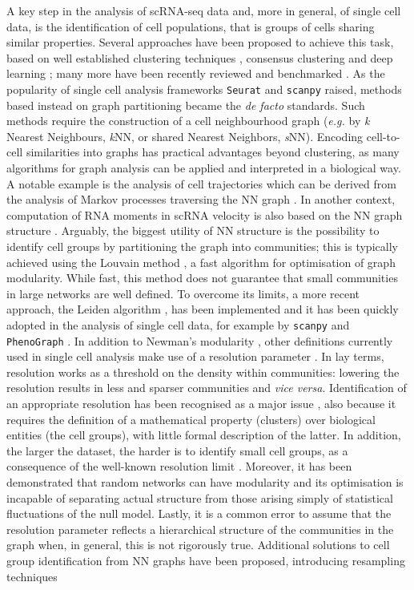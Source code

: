 \documentclass[10pt]{article}
\begin{document}
A key step in the analysis of scRNA-seq data and, more in general, of single cell data, is the identification of cell populations, that is groups of cells sharing similar properties. Several approaches have been proposed to achieve this task, based on well established clustering techniques \cite{wang_2017, lin_2017}, consensus clustering \cite{huh_2020, kiselev_2017, Ranjan_2021} and deep learning \cite{li_2020}; many more have been recently reviewed \cite{krzak_2019, kiselev_2019} and benchmarked \cite{du_2018}. As the popularity of single cell analysis frameworks \texttt{Seurat} \cite{butler_2018} and \texttt{scanpy} \cite{wolf_2018} raised, methods based instead on graph partitioning became the \emph{de facto} standards. Such methods require the construction of a cell neighbourhood graph (\emph{e.g.} by \emph{k }Nearest Neighbours, \emph{k}NN, or shared Nearest Neighbors, \emph{s}NN). Encoding cell-to-cell similarities into graphs has practical advantages beyond clustering, as many algorithms for graph analysis can be applied and interpreted in a biological way. A notable example is the analysis of cell trajectories which can be derived from the analysis of Markov processes traversing the NN graph \cite{Setty_2019, Lange_2020}. In another context, computation of RNA moments in scRNA velocity is also based on the NN graph structure \cite{Bergen_2020}. Arguably, the biggest utility of NN structure is the possibility to identify cell groups by partitioning the graph into communities; this is typically achieved using the Louvain method \cite{blondel_2008}, a fast algorithm for optimisation of graph modularity. While fast, this method does not guarantee that small communities in large networks are well defined. To overcome its limits, a more recent approach, the Leiden algorithm \cite{traag_2019}, has been implemented and it has been quickly adopted in the analysis of single cell data, for example by \texttt{scanpy} \cite{wolf_2018} and \texttt{PhenoGraph} \cite{levine_2015}. In addition to Newman's modularity \cite{newman_2004}, other definitions currently used in single cell analysis make use of a resolution parameter \cite{traag_2011, reichardt_2006}. In lay terms, resolution works as a threshold on the density within communities: lowering the resolution results in less and sparser communities and \emph{vice versa}. Identification of an appropriate resolution has been recognised as a major issue \cite{lhnemann_2020}, also because it requires the definition of a mathematical property (clusters) over biological entities (the cell groups), with little formal description of the latter. In addition, the larger the dataset, the harder is to identify small cell groups, as a consequence of the well-known resolution limit \cite{fortunato_2007}. Moreover, it has been demonstrated that random networks can have modularity \cite{guimer_2004} and its optimisation is incapable of separating actual structure from those arising simply of statistical fluctuations of the null model. Lastly, it is a common error to assume that the resolution parameter reflects a hierarchical structure of the communities in the graph when, in general, this is not rigorously true. Additional solutions to cell group identification from NN graphs have been proposed, introducing resampling techniques 
\end{document}
